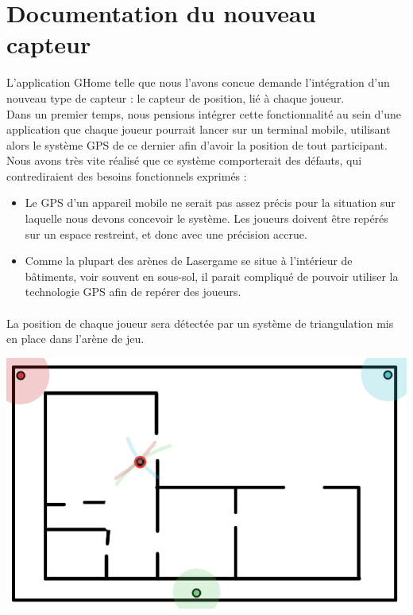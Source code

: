 \section{Documentation du nouveau capteur}

L'application GHome telle que nous l'avons concue demande l'intégration d'un nouveau type de capteur : le capteur de position, lié à chaque joueur.\\

Dans un premier temps, nous pensions intégrer cette fonctionnalité au sein d'une application que chaque joueur pourrait lancer sur un terminal mobile, utilisant alors le système GPS de ce dernier afin d'avoir la position de tout participant.\\
Nous avons très vite réalisé que ce système comporterait des défauts, qui contrediraient des besoins fonctionnels exprimés : 
\begin{itemize}
 \item Le GPS d'un appareil mobile ne serait pas assez précis pour la situation sur laquelle nous devons concevoir le système. Les joueurs doivent être repérés sur un espace restreint, et donc avec une précision accrue.
 \item Comme la plupart des arènes de Lasergame se situe à l'intérieur de bâtiments, voir souvent en sous-sol, il parait compliqué de pouvoir utiliser la technologie GPS afin de repérer des joueurs.
\end{itemize}

\paragraph{}
La position de chaque joueur sera détectée par un système de triangulation mis en place dans l'arène de jeu.\\
\begin{center}
 \includegraphics[scale=0.5]{image/triang}
\end{center}

